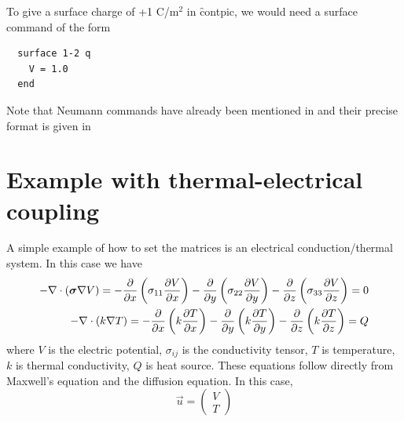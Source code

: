 \documentclass[a4paper,twoside,11pt]{book}
\begin{document}
To give a surface charge of +1 C/m$^2$ in \f{contpic}, we would need a
surface command of the form
\begin{verbatim}
  surface 1-2 q
    V = 1.0
  end
\end{verbatim}
Note that Neumann  commands have already been mentioned
in  and their precise format is given in

\section{Example with thermal-electrical coupling}
\label{thermo}

A simple example of how to set the matrices is an electrical
conduction/thermal system. In this case we have
\begin{eqnarray}
-\nabla\cdot(\mbox{\boldmath $\sigma$}\nabla V)=
-\frac{\partial}{\partial x}\left(\sigma_{11} \frac{\partial V}{\partial x}\right)
-\frac{\partial}{\partial y}\left(\sigma_{22} \frac{\partial V}{\partial y}\right)
-\frac{\partial}{\partial z}\left(\sigma_{33} \frac{\partial V}{\partial z}\right)=0\\
-\nabla\cdot(k\nabla T)=
-\frac{\partial}{\partial x}\left(k \frac{\partial T}{\partial x}\right)
-\frac{\partial}{\partial y}\left(k \frac{\partial T}{\partial y}\right)
-\frac{\partial}{\partial z}\left(k \frac{\partial T}{\partial z}\right)=Q
\end{eqnarray}
where $V$ is the electric potential, $\sigma_{ij}$ is the conductivity
tensor, $T$ is temperature, $k$ is thermal conductivity, $Q$ is heat
source. These equations follow directly
from Maxwell's equation and the diffusion equation. In this case,
\begin{equation}
  \vec u=
  \left(\begin{array}{c}
    V\\
    T
  \end{array}\right)
\end{equation}
\end{document}
